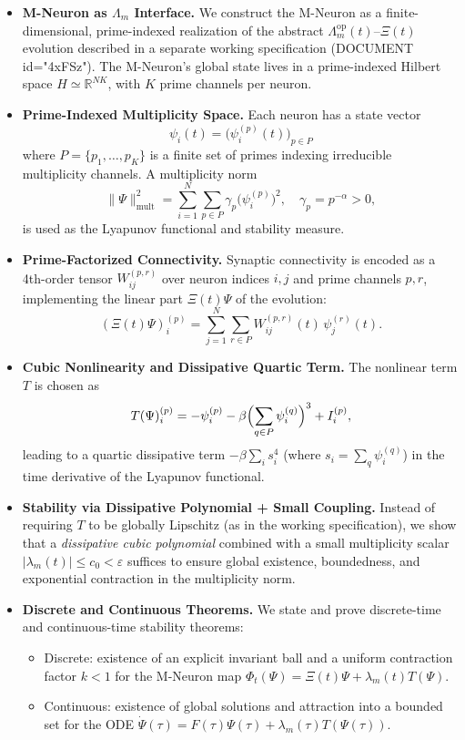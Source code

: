 \documentclass[11pt]{article}
\begin{document}
\begin{itemize}[leftmargin=*]
  \item \textbf{M-Neuron as \(\Lambda_m\) Interface.}
  We construct the M-Neuron as a finite-dimensional, prime-indexed realization of the abstract \(\Lambda_m^{\mathrm{op}}(t)\)–\(\Xi(t)\) evolution described in a separate working specification (DOCUMENT id="4xFSz"). The M-Neuron's global state lives in a prime-indexed Hilbert space \(H \simeq \mathbb{R}^{N K}\), with \(K\) prime channels per neuron.

  \item \textbf{Prime-Indexed Multiplicity Space.}
  Each neuron has a state vector
  \[
  \psi_i(t) = \bigl(\psi_i^{(p)}(t)\bigr)_{p \in P}
  \]
  where \(P=\{p_1,\dots,p_K\}\) is a finite set of primes indexing irreducible multiplicity channels.
  A multiplicity norm
  \[
  \|\Psi\|_{\mathrm{mult}}^2 = \sum_{i=1}^N \sum_{p\in P} \gamma_p \bigl(\psi_i^{(p)}\bigr)^2, \quad \gamma_p = p^{-\alpha}>0,
  \]
  is used as the Lyapunov functional and stability measure.

  \item \textbf{Prime-Factorized Connectivity.}
  Synaptic connectivity is encoded as a 4th-order tensor \(W_{ij}^{(p,r)}\) over neuron indices \(i,j\) and prime channels \(p,r\), implementing the linear part \(\Xi(t)\Psi\) of the evolution:
  \[
  (\Xi(t)\Psi)_i^{(p)} = \sum_{j=1}^N \sum_{r\in P} W_{ij}^{(p,r)}(t)\, \psi_j^{(r)}(t).
  \]

  \item \textbf{Cubic Nonlinearity and Dissipative Quartic Term.}
  The nonlinear term \(T\) is chosen as
  \[
  T(\Psi)_i^{(p)} = -\psi_i^{(p)} - \beta \Bigl(\sum_{q\in P} \psi_i^{(q)}\Bigr)^3 + I_i^{(p)},
  \]
  leading to a quartic dissipative term \(-\beta \sum_i s_i^4\) (where \(s_i=\sum_q \psi_i^{(q)}\)) in the time derivative of the Lyapunov functional.

  \item \textbf{Stability via Dissipative Polynomial + Small Coupling.}
  Instead of requiring \(T\) to be globally Lipschitz (as in the working specification), we show that a \emph{dissipative cubic polynomial} combined with a small multiplicity scalar \(|\lambda_m(t)|\le c_0<\varepsilon\) suffices to ensure global existence, boundedness, and exponential contraction in the multiplicity norm.

  \item \textbf{Discrete and Continuous Theorems.}
  We state and prove discrete-time and continuous-time stability theorems:
  \begin{itemize}
    \item Discrete: existence of an explicit invariant ball and a uniform contraction factor \(k<1\) for the M-Neuron map \(\Phi_t(\Psi) = \Xi(t)\Psi + \lambda_m(t)T(\Psi)\).
    \item Continuous: existence of global solutions and attraction into a bounded set for the ODE \(\dot{\Psi}(\tau) = F(\tau)\Psi(\tau) + \lambda_m(\tau)T(\Psi(\tau))\).
  \end{itemize}


\end{itemize}
\end{document}
